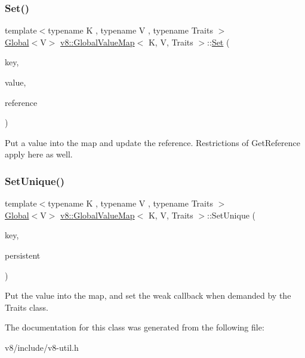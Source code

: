 \subsubsection{\texorpdfstring{Set()}{Set()}\hspace{0.1cm}{\footnotesize\ttfamily [3/3]}}
{\footnotesize\ttfamily template$<$typename K , typename V , typename Traits $>$ \\
\mbox{\hyperlink{classv8_1_1Global}{Global}}$<$V$>$ \mbox{\hyperlink{classv8_1_1GlobalValueMap}{v8\+::\+Global\+Value\+Map}}$<$ K, V, Traits $>$\+::\mbox{\hyperlink{classv8_1_1Set}{Set}} (\begin{DoxyParamCaption}\item[{const K \&}]{key,  }\item[{\mbox{\hyperlink{classv8_1_1Global}{Global}}$<$ V $>$}]{value,  }\item[{\mbox{\hyperlink{classv8_1_1PersistentValueMapBase_1_1PersistentValueReference}{Persistent\+Value\+Reference}} $\ast$}]{reference }\end{DoxyParamCaption})\hspace{0.3cm}{\ttfamily [inline]}}

Put a value into the map and update the reference. Restrictions of Get\+Reference apply here as well. \mbox{\label{classv8_1_1GlobalValueMap_aad73de3912571a2f245454d3edea4a41}} 
\subsubsection{\texorpdfstring{Set\+Unique()}{SetUnique()}}
{\footnotesize\ttfamily template$<$typename K , typename V , typename Traits $>$ \\
\mbox{\hyperlink{classv8_1_1Global}{Global}}$<$V$>$ \mbox{\hyperlink{classv8_1_1GlobalValueMap}{v8\+::\+Global\+Value\+Map}}$<$ K, V, Traits $>$\+::Set\+Unique (\begin{DoxyParamCaption}\item[{const K \&}]{key,  }\item[{\mbox{\hyperlink{classv8_1_1Global}{Global}}$<$ V $>$ $\ast$}]{persistent }\end{DoxyParamCaption})\hspace{0.3cm}{\ttfamily [inline]}}

Put the value into the map, and set the \textquotesingle{}weak\textquotesingle{} callback when demanded by the Traits class. 

The documentation for this class was generated from the following file\+:\begin{DoxyCompactItemize}
\item 
v8/include/v8-\/util.\+h\end{DoxyCompactItemize}
